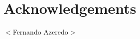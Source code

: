 \chapter*{Acknowledgements}

\vspace{10mm}

\begin{flushleft}
$<$Fernando Azeredo$>$
\end{flushleft}